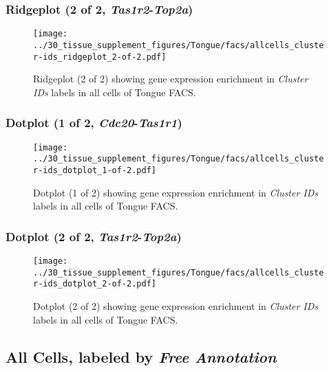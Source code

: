 \clearpage

\subsubsection{Ridgeplot (2 of 2, \emph{Tas1r2}-\emph{Top2a})}
\begin{figure}[h]
\centering
\texttt{[image: ../30\_tissue\_supplement\_figures/Tongue/facs/allcells\_cluster-ids\_ridgeplot\_2-of-2.pdf]}

\caption{ Ridgeplot (2 of 2)  showing gene expression enrichment in \emph{Cluster IDs} labels in all cells of Tongue FACS. }
\end{figure}


\clearpage

\subsubsection{Dotplot (1 of 2, \emph{Cdc20}-\emph{Tas1r1})}
\begin{figure}[h]
\centering
\texttt{[image: ../30\_tissue\_supplement\_figures/Tongue/facs/allcells\_cluster-ids\_dotplot\_1-of-2.pdf]}

\caption{ Dotplot (1 of 2)  showing gene expression enrichment in \emph{Cluster IDs} labels in all cells of Tongue FACS. }
\end{figure}


\clearpage

\subsubsection{Dotplot (2 of 2, \emph{Tas1r2}-\emph{Top2a})}
\begin{figure}[h]
\centering
\texttt{[image: ../30\_tissue\_supplement\_figures/Tongue/facs/allcells\_cluster-ids\_dotplot\_2-of-2.pdf]}

\caption{ Dotplot (2 of 2)  showing gene expression enrichment in \emph{Cluster IDs} labels in all cells of Tongue FACS. }
\end{figure}


\clearpage

\subsection{All Cells, labeled by \emph{Free Annotation}}
